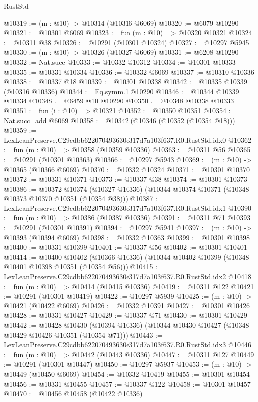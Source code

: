 \begin{lexlean}{RustStd}
\begin{coremodule}
@10319 := (m : @10) -> @10314 (@10316 @6069)
@10320 := @6079 @10290
@10321 := @10301 @6069
@10323 := fun (m : @10) => @10320 @10321
@10324 := @10311 @38
@10326 := @10291 (@10301 @10324)
@10327 := @10297 @5945
@10330 := (m : @10) -> @10326 (@10327 @6069)
@10331 := @6208 @10290
@10332 := Nat.succ
@10333 := @10332 @10312
@10334 := @10301 @10333
@10335 := @10331 @10334
@10336 := @10332 @6069
@10337 := @10310 @10336
@10338 := @10337 @18
@10339 := @10301 @10338
@10342 := @10335 @10339 (@10316 @10336)
@10344 := Eq.symm.{1} @10290
@10346 := @10344 @10339 @10334
@10348 := @6459 @10 @10290
@10350 := @10348 @10338 @10333
@10351 := fun (i : @10) => @10321
@10352 := @10350 @10351
@10354 := Nat.succ_add @6069
@10358 := @10342 (@10346 (@10352 (@10354 @18)))
@10359 := LexLeanPreserve.C29cdbb622070493630e317d7a103f637.R0.RustStd.idx0
@10362 := fun (m : @10) => @10358 (@10359 @10336)
@10363 := @10311 @56
@10365 := @10291 (@10301 @10363)
@10366 := @10297 @5943
@10369 := (m : @10) -> @10365 (@10366 @6069)
@10370 := @10332 @10324
@10371 := @10301 @10370
@10372 := @10331 @10371
@10373 := @10337 @38
@10374 := @10301 @10373
@10386 := @10372
    @10374
    (@10327 @10336)
    (@10344 @10374 @10371 (@10348 @10373 @10370 @10351 (@10354 @38)))
@10387 := LexLeanPreserve.C29cdbb622070493630e317d7a103f637.R0.RustStd.idx1
@10390 := fun (m : @10) => @10386 (@10387 @10336)
@10391 := @10311 @71
@10393 := @10291 (@10301 @10391)
@10394 := @10297 @5941
@10397 := (m : @10) -> @10393 (@10394 @6069)
@10398 := @10332 @10363
@10399 := @10301 @10398
@10400 := @10331 @10399
@10401 := @10337 @56
@10402 := @10301 @10401
@10414 := @10400
    @10402
    (@10366 @10336)
    (@10344 @10402 @10399 (@10348 @10401 @10398 @10351 (@10354 @56)))
@10415 := LexLeanPreserve.C29cdbb622070493630e317d7a103f637.R0.RustStd.idx2
@10418 := fun (m : @10) => @10414 (@10415 @10336)
@10419 := @10311 @122
@10421 := @10291 (@10301 @10419)
@10422 := @10297 @5939
@10425 := (m : @10) -> @10421 (@10422 @6069)
@10426 := @10332 @10391
@10427 := @10301 @10426
@10428 := @10331 @10427
@10429 := @10337 @71
@10430 := @10301 @10429
@10442 := @10428
    @10430
    (@10394 @10336)
    (@10344 @10430 @10427 (@10348 @10429 @10426 @10351 (@10354 @71)))
@10443 := LexLeanPreserve.C29cdbb622070493630e317d7a103f637.R0.RustStd.idx3
@10446 := fun (m : @10) => @10442 (@10443 @10336)
@10447 := @10311 @127
@10449 := @10291 (@10301 @10447)
@10450 := @10297 @5937
@10453 := (m : @10) -> @10449 (@10450 @6069)
@10454 := @10332 @10419
@10455 := @10301 @10454
@10456 := @10331 @10455
@10457 := @10337 @122
@10458 := @10301 @10457
@10470 := @10456
    @10458
    (@10422 @10336)

\end{coremodule}
\end{lexlean}

